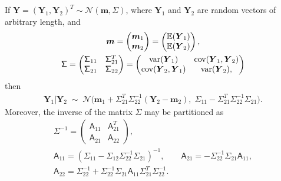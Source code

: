 \documentclass{svjour3}                     %
\newcommand{\bm}[1]{\boldsymbol{#1}}
\newcommand{\mSigma}{\mathsf{\Sigma}}
\newcommand{\Ex}{\mathbb{E}}
\newcommand{\vm}{\bm{m}}
\newcommand{\vY}{\bm{Y}}
\newcommand{\mA}{\mathsf{A}}
\newcommand{\cov}{{\textup{cov}}}
\newcommand{\var}{{\textup{var}}}
\newcommand{\calN}{\mathcal{N}}
\begin{document}
\begin{lemma} \citep[(A.6), (A.11--13)]{RasWil06a} \label{thrm:condDist} If $\vY = (\vY_1, \vY_2)^T \sim \calN (\vm,\mSigma)$, where $\vY_1$ and $\vY_2$ are random vectors of arbitrary length, and 
	\begin{gather*}
	\vm = \begin{pmatrix} \vm_1 \\ \vm_2 \end{pmatrix} = \begin{pmatrix} \Ex(\vY_1) \\ \Ex(\vY_2) \end{pmatrix}, \\
	\mSigma = \begin{pmatrix}
	\mSigma_{11} & \mSigma_{21}^T \\ 	\mSigma_{21} & \mSigma_{22}
	\end{pmatrix} =
	\begin{pmatrix}
	\var(\vY_{1}) & \cov(\vY_{1}, \vY_2) \\ 	\cov(\vY_2,\vY_{1}) & \var(\vY_{2}),
	\end{pmatrix} 
	\end{gather*}
	then 
	\begin{align*}
	\vY_1 \vert \vY_2 \; \sim \; \calN \bigl(\vm_1 + \mSigma_{21}^T \mSigma_{22}^{-1}(\vY_2 - \vm_2),  \; \mSigma_{11} - \mSigma_{21}^T \mSigma_{22}^{-1} \mSigma_{21} \bigr).
	\end{align*}
Moreover, the inverse of the matrix $\mSigma$ may be partitioned as
\begin{gather*}
\mSigma^{-1} = \begin{pmatrix} \mA_{11} & \mA_{21}^T \\ \mA_{21} & \mA_{22} \end{pmatrix}, \\
\mA_{11} = (\mSigma_{11} - \mSigma_{12} \mSigma_{22}^{-1} \mSigma_{21})^{-1}, \qquad 
\mA_{21} = -  \mSigma_{22}^{-1} \mSigma_{21} \mA_{11}, \\ 
\mA_{22} = \mSigma_{22}^{-1} + \mSigma_{22}^{-1} \mSigma_{21} \mA_{11} \mSigma_{21}^T \mSigma_{22}^{-1}.
\end{gather*}

\end{lemma}
\end{document}
